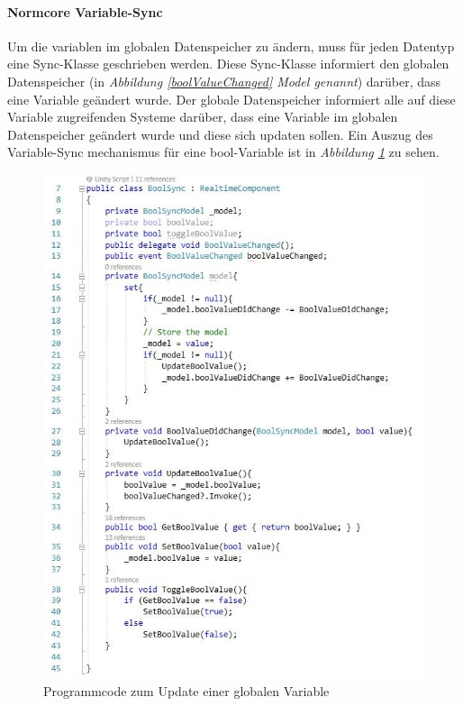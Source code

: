 \documentclass[a4paper,11pt]{article}%
\renewcommand{\\}{\vspace*{0.5\baselineskip} \newline}
\begin{document}
\paragraph{Normcore Variable-Sync}
Um die variablen im globalen Datenspeicher zu ändern, muss für jeden Datentyp eine Sync-Klasse geschrieben werden. Diese Sync-Klasse informiert den globalen Datenspeicher (in \textit{Abbildung \ref{boolValueChanged} \dq{}Model\dq{} genannt}) darüber, dass eine Variable geändert wurde. Der globale Datenspeicher informiert alle auf diese Variable zugreifenden Systeme darüber, dass eine Variable im globalen Datenspeicher geändert wurde und diese sich updaten sollen. Ein Auszug des Variable-Sync mechanismus für eine bool-Variable ist in \textit{Abbildung \ref{boolSync}} zu sehen.

\begin{figure}[H]
		\begin{footnotesize}
			\includegraphics[scale=.75]{Abbildungen/boolValueChanged.jpg}
			
			\caption[Abbildung 1]{Programmcode zum Update einer globalen Variable}
			\label{boolSync}
		\end{footnotesize}
	\end{figure}
\end{document}
